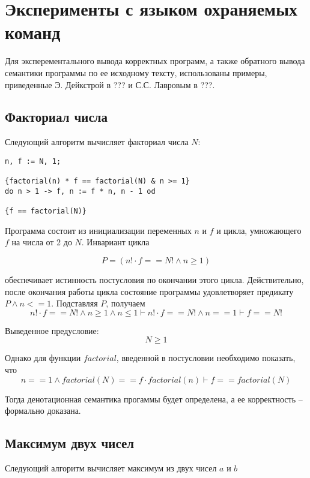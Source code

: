 \chapter{Эксперименты с языком охраняемых команд} \label{ch4}

Для эксперементального вывода корректных программ, а также обратного вывода семантики программы
по ее исходному тексту, использованы примеры, приведенные Э. Дейкстрой в ??? и С.С. Лавровым в ???.

\section{Факториал числа}
Следующий алгоритм вычисляет факториал числа $N$:
\begin{verbatim}
n, f := N, 1;

{factorial(n) * f == factorial(N) & n >= 1}
do n > 1 -> f, n := f * n, n - 1 od

{f == factorial(N)}
\end{verbatim}

Программа состоит из инициализации переменных $n$ и $f$ и цикла,
умножающего $f$ на числа от 2 до $N$. Инвариант цикла

\begin{equation}
    P = \left( n! \cdot f == N! \wedge n \geq 1 \right)
\end{equation}

обеспечивает истинность постусловия по окончании этого цикла. Действительно,
после окончания работы цикла состояние программы удовлетворяет предикату $P \wedge n <= 1$. Подставляя $P$, получаем
\begin{equation}
n! \cdot f == N! \wedge n \geq 1 \wedge n \leq 1  \vdash n! \cdot f == N! \wedge n == 1 \vdash f == N!
\end{equation}

Выведенное предусловие: 
\begin{equation}
    N \geq 1
\end{equation}

Однако для функции $factorial$, введенной в постусловии необходимо показать, что
\begin{equation}
    n == 1 \wedge factorial(N) == f \cdot factorial(n) \vdash f == factorial(N)
\end{equation}

Тогда денотационная семантика прогаммы будет определена, а ее корректность -- формально доказана.

\section{Максимум двух чисел}
Следующий алгоритм вычисляет максимум из двух чисел $a$ и $b$

